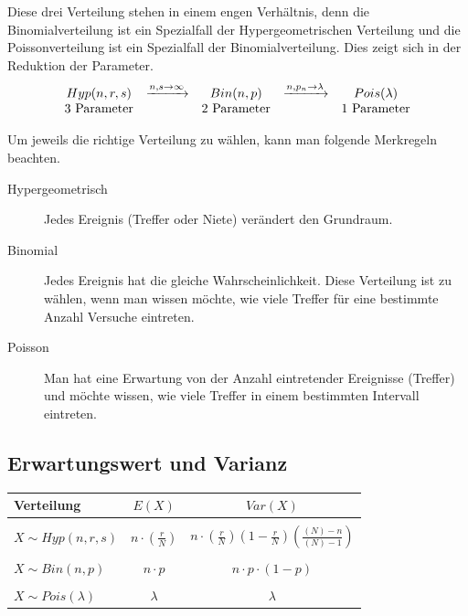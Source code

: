 \noindent
Diese drei Verteilung stehen in einem engen Verhältnis, denn die
Binomialverteilung ist ein Spezialfall der Hypergeometrischen 
Verteilung und die Poissonverteilung ist ein Spezialfall der
Binomialverteilung. Dies zeigt sich in der Reduktion der Parameter.
\[ \begin{array}{c c c c c}
	Hyp(n,r,s)
		& \xrightarrow{n,s \rightarrow \infty}
		& Bin(n,p)
		& \xrightarrow{n,p_n \rightarrow \lambda}
		& Pois(\lambda) \\
	3 \text{ Parameter}
		& 
		& 2 \text{ Parameter}
		& 
		& 1 \text{ Parameter}
\end{array} \]

\noindent
Um jeweils die richtige Verteilung zu wählen, kann man folgende Merkregeln 
beachten.

\begin{description}
	\item[Hypergeometrisch]
		Jedes Ereignis (Treffer oder Niete) verändert den 
		Grundraum.
	\item[Binomial] Jedes Ereignis hat die gleiche 
		Wahrscheinlichkeit. Diese Verteilung ist zu wählen,
		wenn man wissen möchte, wie viele Treffer für eine
		bestimmte Anzahl Versuche eintreten.
	\item[Poisson] Man hat eine Erwartung von der Anzahl 
		eintretender Ereignisse (Treffer) und möchte wissen,
		wie viele Treffer in einem bestimmten Intervall 
		eintreten.
\end{description}

\subsection{Erwartungswert und Varianz}

\begin{table}[h!]
	\centering
	\begin{tabular}{l c c}
		Verteilung
			& $E(X)$
			& $Var(X)$ \\
		\hline
		& & \\
		$X \sim Hyp(n,r,s)$
			& $n \cdot \left(\frac{r}{N}\right)$
			& $n \cdot \left( 
				\frac{r}{N}
				\right) 
			\left( 
				1 - \frac{r}{N}
			\right)
			\left(
				\frac{(N)-n}{(N)-1}
			\right)$ \\
		& & \\
		$X \sim Bin(n,p)$
			& $n \cdot p$
			& $n \cdot p \cdot (1-p)$ \\
		& & \\
		$X \sim Pois(\lambda)$
			& $\lambda$
			& $\lambda$
	\end{tabular}
\end{table}


